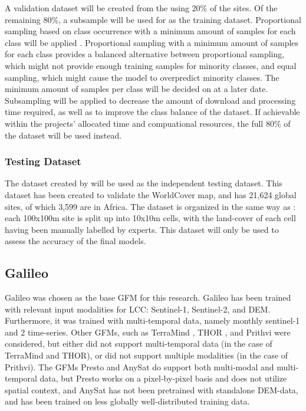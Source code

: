 \documentclass[a4paper,12pt]{article}
\begin{document}
A validation dataset will be created from the \citet{lesivGlobalReferenceData2025} using 20\% of the sites. Of the remaining 80\%, a subsample will be used for as the training dataset. Proportional sampling based on class occurrence with a minimum amount of samples for each class will be applied \citep{zhuOptimizingSelectionTraining2016b}. Proportional sampling with a minimum amount of samples for each class provides a balanced alternative between proportional sampling, which might not provide enough training samples for minority classes, and equal sampling, which might cause the model to overpredict minority classes. The minimum amount of samples per class will be decided on at a later date. Subsampling will be applied to decrease the amount of download and processing time required, as well as to improve the class balance of the dataset. If achievable within the projects' allocated time and compuational resources, the full 80\% of the dataset will be used instead.

\subsubsection{Testing Dataset}
The dataset created by \citet{tsendbazarProductValidationReport2022} will be used as the independent testing dataset. This dataset has been created to validate the WorldCover \citep{zanagaESAWorldCover102022} map, and has 21,624 global sites, of which 3,599 are in Africa. The dataset is organized in the same way as \citet{lesivGlobalReferenceData2025}: each 100x100m site is split up into 10x10m cells, with the land-cover of each cell having been manually labelled by experts. This dataset will only be used to assess the accuracy of the final models.

\subsection{Galileo}
Galileo \citep{tsengGalileoLearningGlobal2025} was chosen as the base \ac{GFM} for this research. Galileo has been trained with relevant input modalities for \ac{LCC}: Sentinel-1, Sentinel-2, and \ac{DEM}. Furthermore, it was trained with multi-temporal data, namely monthly sentinel-1 and 2 time-series. Other \acp{GFM}, such as TerraMind \citep{jakubikTerraMindLargeScaleGenerative2026}, THOR \citep{forgaardTHORVersatileFoundation2026}, and Prithvi \citep{szwarcmanPrithviEO20VersatileMultiTemporal2026} were considered, but either did not support multi-temporal data (in the case of TerraMind and THOR), or did not support multiple modalities (in the case of Prithvi). The \acp{GFM} Presto \citep{tsengLightweightPretrainedTransformers2024} and AnySat \citep{astrucAnySatOneEarth2025} do support both multi-modal and multi-temporal data, but Presto works on a pixel-by-pixel basis and does not utilize spatial context, and AnySat has not been pretrained with standalone DEM-data, and has been trained on less globally well-distributed training data.
\end{document}
